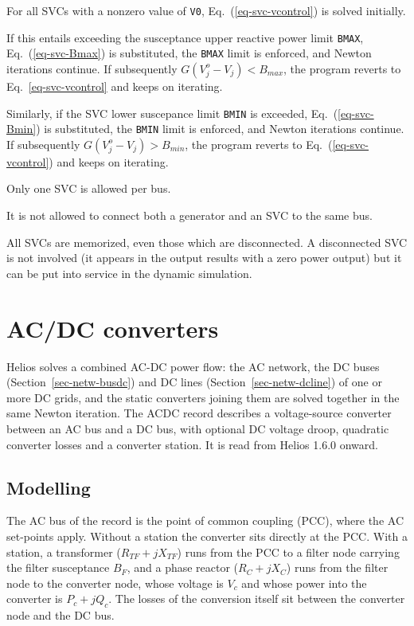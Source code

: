 For all SVCs with a nonzero value of {\tt V0}, Eq.~(\ref{eq-svc-vcontrol}) is solved initially.

If this entails exceeding the susceptance upper reactive power limit {\tt BMAX}, Eq.~(\ref{eq-svc-Bmax}) is substituted, the {\tt BMAX} limit is enforced, and Newton iterations continue. If subsequently $G(V_j^o-V_j)< B_{max}$, the program reverts to Eq.~\ref{eq-svc-vcontrol} and keeps on iterating.

Similarly, if the SVC lower suscepance limit {\tt BMIN} is exceeded, Eq.~(\ref{eq-svc-Bmin}) is substituted, the {\tt BMIN} limit is enforced, and Newton iterations continue. If subsequently $G(V_j^o-V_j) > B_{min}$, the program reverts to Eq.~(\ref{eq-svc-vcontrol}) and keeps on iterating.

Only one SVC is allowed per bus. 

It is not allowed to connect both a generator and an SVC to the same bus.

All SVCs are memorized, even those which are disconnected. A disconnected SVC is not involved (it appears in the output results with a zero power output) but it can be put into service in the
dynamic simulation.


\section{AC/DC converters}\label{sec-pf-acdc}

Helios solves a combined AC-DC power flow: the AC network, the DC buses (Section~\ref{sec-netw-busdc}) and DC lines (Section~\ref{sec-netw-dcline}) of one or more DC grids, and the static converters joining them are solved together in the same Newton iteration. The ACDC record describes a voltage-source converter between an AC bus and a DC bus, with optional DC voltage droop, quadratic converter losses and a converter station. It is read from Helios 1.6.0 onward.

\subsection{Modelling}

The AC bus of the record is the point of common coupling (PCC), where the AC set-points apply. Without a station the converter sits directly at the PCC. With a station, a transformer ($R_{TF} + jX_{TF}$) runs from the PCC to a filter node carrying the filter susceptance $B_F$, and a phase reactor ($R_C + jX_C$) runs from the filter node to the converter node, whose voltage is $V_c$ and whose power into the converter is $P_c + jQ_c$. The losses of the conversion itself sit between the converter node and the DC bus.

